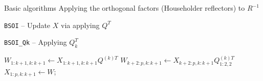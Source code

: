 \documentclass[xcolor=table,final]{beamer} %
\begin{document}
\begin{frame}{Basic algorithms}{%
    Applying the orthogonal factors (Householder reflectors) to $R^{-1}$}
  \begin{block}{{\tt BSOI} -- Update $X$ via applying $Q^{T}$}
    \begin{algorithm}[H]
      \BlankLine

      \BlankLine
    \end{algorithm}    
  \end{block}

  \begin{block}{{\tt BSOI\_Qk} -- Applying $Q_k^{T}$}
    \begin{algorithm}[H]

      $W_{1:k+1,k:k+1} \gets X_{1:k+1,k:k+1} Q^{(k)T} $\;
      $W_{k+2:p,k:k+1} \gets X_{k+2:p,k:k+1} Q_{1:2,2}^{(k)T}$\;
      $X_{1:p,k:k+1} \gets W$;
    \end{algorithm}    
  \end{block}
\end{frame}
\end{document}

